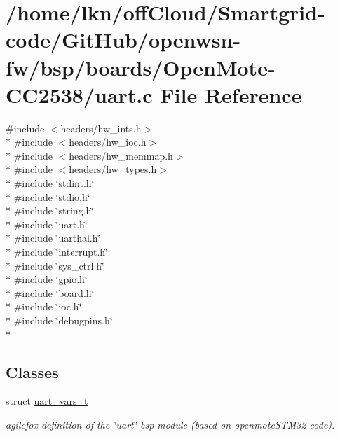 \hypertarget{_open_mote-_c_c2538_2uart_8c}{}\section{/home/lkn/off\+Cloud/\+Smartgrid-\/code/\+Git\+Hub/openwsn-\/fw/bsp/boards/\+Open\+Mote-\/\+C\+C2538/uart.c File Reference}
\label{_open_mote-_c_c2538_2uart_8c}
{\ttfamily \#include $<$headers/hw\+\_\+ints.\+h$>$}\\*
{\ttfamily \#include $<$headers/hw\+\_\+ioc.\+h$>$}\\*
{\ttfamily \#include $<$headers/hw\+\_\+memmap.\+h$>$}\\*
{\ttfamily \#include $<$headers/hw\+\_\+types.\+h$>$}\\*
{\ttfamily \#include \char`\"{}stdint.\+h\char`\"{}}\\*
{\ttfamily \#include \char`\"{}stdio.\+h\char`\"{}}\\*
{\ttfamily \#include \char`\"{}string.\+h\char`\"{}}\\*
{\ttfamily \#include \char`\"{}uart.\+h\char`\"{}}\\*
{\ttfamily \#include \char`\"{}uarthal.\+h\char`\"{}}\\*
{\ttfamily \#include \char`\"{}interrupt.\+h\char`\"{}}\\*
{\ttfamily \#include \char`\"{}sys\+\_\+ctrl.\+h\char`\"{}}\\*
{\ttfamily \#include \char`\"{}gpio.\+h\char`\"{}}\\*
{\ttfamily \#include \char`\"{}board.\+h\char`\"{}}\\*
{\ttfamily \#include \char`\"{}ioc.\+h\char`\"{}}\\*
{\ttfamily \#include \char`\"{}debugpins.\+h\char`\"{}}\\*
\subsection*{Classes}
\begin{DoxyCompactItemize}
\item 
struct \hyperlink{structuart__vars__t}{uart\+\_\+vars\+\_\+t}
\begin{DoxyCompactList}\small\item\em agilefox definition of the \char`\"{}uart\char`\"{} bsp module (based on openmote\+S\+T\+M32 code). \end{DoxyCompactList}\end{DoxyCompactItemize}
